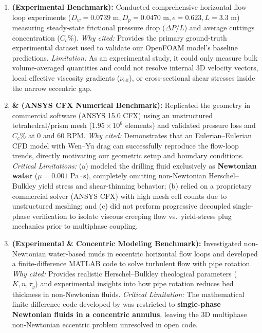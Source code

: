 \begin{enumerate}
    \item \textbf{\citet{Osgouei2010} (Experimental Benchmark):} Conducted comprehensive horizontal flow-loop experiments ($D_w = 0.0739\text{ m}, D_p = 0.0470\text{ m}, e = 0.623, L = 3.3\text{ m}$) measuring steady-state frictional pressure drop ($\Delta P/L$) and average cuttings concentration ($C_c\%$). \textit{Why cited:} Provides the primary ground-truth experimental dataset used to validate our OpenFOAM model's baseline predictions. \textit{Limitation:} As an experimental study, it could only measure bulk volume-averaged quantities and could not resolve internal 3D velocity vectors, local effective viscosity gradients ($\nu_{\text{eff}}$), or cross-sectional shear stresses inside the narrow eccentric gap.
    
    \item \textbf{\citet{Shehab2015} \& \citet{Ofei2015} (ANSYS CFX Numerical Benchmark):} Replicated the \citet{Osgouei2010} geometry in commercial software (ANSYS 15.0 CFX) using an unstructured tetrahedral/prism mesh ($1.95 \times 10^6$ elements) and validated pressure loss and $C_c\%$ at $0$ and $60\text{ RPM}$. \textit{Why cited:} Demonstrates that an Eulerian--Eulerian CFD model with Wen--Yu drag can successfully reproduce the \citet{Osgouei2010} flow-loop trends, directly motivating our geometric setup and boundary conditions. \textit{Critical Limitations:} (a) \citet{Shehab2015} modeled the drilling fluid exclusively as \textbf{Newtonian water} ($\mu = 0.001\text{ Pa}\cdot\text{s}$), completely omitting non-Newtonian Herschel--Bulkley yield stress and shear-thinning behavior; (b) relied on a proprietary commercial solver (ANSYS CFX) with high mesh cell counts due to unstructured meshing; and (c) did not perform progressive decoupled single-phase verification to isolate viscous creeping flow vs.\ yield-stress plug mechanics prior to multiphase coupling.
    
    \item \textbf{\citet{Sorgun2010} (Experimental \& Concentric Modeling Benchmark):} Investigated non-Newtonian water-based muds in eccentric horizontal flow loops and developed a finite-difference MATLAB code to solve turbulent flow with pipe rotation. \textit{Why cited:} Provides realistic Herschel--Bulkley rheological parameters ($K, n, \tau_y$) and experimental insights into how pipe rotation reduces bed thickness in non-Newtonian fluids. \textit{Critical Limitation:} The mathematical finite-difference code developed by \citet{Sorgun2010} was restricted to \textbf{single-phase Newtonian fluids in a concentric annulus}, leaving the 3D multiphase non-Newtonian eccentric problem unresolved in open code.
    

\end{enumerate}
